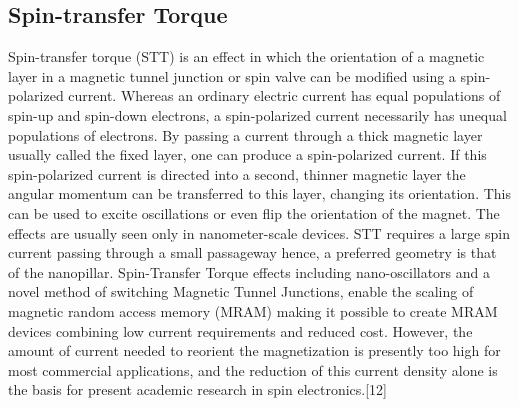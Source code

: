\documentclass{article}
\begin{document}
\subsection{Spin-transfer Torque}
Spin-transfer torque (STT) is an effect in which the orientation of a magnetic layer in a magnetic tunnel junction or spin valve can be modified using a spin-polarized current. Whereas an ordinary electric current has equal populations of spin-up and spin-down electrons, a spin-polarized current necessarily has unequal populations of electrons. By passing a current through a thick magnetic layer usually called the fixed layer, one can produce a spin-polarized current. If this spin-polarized current is directed into a second, thinner magnetic layer the angular momentum can be transferred to this layer, changing its orientation. This can be used to excite oscillations or even flip the orientation of the magnet. The effects are usually seen only in nanometer-scale devices. STT requires a large spin current passing through a small passageway hence, a preferred geometry is that of the nanopillar. Spin-Transfer Torque effects including nano-oscillators and a novel method of switching Magnetic Tunnel Junctions, enable the scaling of magnetic random access memory (MRAM)  making it possible to create MRAM devices combining low current requirements and reduced cost. However, the amount of current needed to reorient the magnetization is presently too high for most commercial applications, and the reduction of this current density alone is the basis for present academic research in spin electronics.[12]
\end{document}
